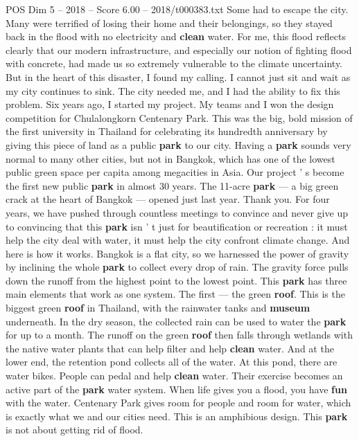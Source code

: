\begin{textsample}{POS Dim 5 – 2018 – Score 6.00 – 2018/t000383.txt}
Some had to escape the city.
Many were terrified of losing their home and their belongings, so they stayed back in the flood with no electricity and \textbf{clean} water.
For me, this flood reflects clearly that our modern infrastructure, and especially our notion of fighting flood with concrete, had made us so extremely vulnerable to the climate uncertainty.
But in the heart of this disaster, I found my calling.
I cannot just sit and wait as my city continues to sink.
The city needed me, and I had the ability to fix this problem.
Six years ago, I started my project.
My teams and I won the design competition for Chulalongkorn Centenary Park.
This was the big, bold mission of the first university in Thailand for celebrating its hundredth anniversary by giving this piece of land as a public \textbf{park} to our city.
Having a \textbf{park} sounds very normal to many other cities, but not in Bangkok, which has one of the lowest public green space per capita among megacities in Asia.
Our project ' s become the first new public \textbf{park} in almost 30 years.
The 11-acre \textbf{park} — a big green crack at the heart of Bangkok — opened just last year.
Thank you.
For four years, we have pushed through countless meetings to convince and never give up to convincing that this \textbf{park} isn ' t just for beautification or recreation : it must help the city deal with water, it must help the city confront climate change.
And here is how it works.
Bangkok is a flat city, so we harnessed the power of gravity by inclining the whole \textbf{park} to collect every drop of rain.
The gravity force pulls down the runoff from the highest point to the lowest point.
This \textbf{park} has three main elements that work as one system.
The first — the green \textbf{roof}.
This is the biggest green \textbf{roof} in Thailand, with the rainwater tanks and \textbf{museum} underneath.
In the dry season, the collected rain can be used to water the \textbf{park} for up to a month.
The runoff on the green \textbf{roof} then falls through wetlands with the native water plants that can help filter and help \textbf{clean} water.
And at the lower end, the retention pond collects all of the water.
At this pond, there are water bikes.
People can pedal and help \textbf{clean} water.
Their exercise becomes an active part of the \textbf{park} water system.
When life gives you a flood, you have \textbf{fun} with the water.
Centenary Park gives room for people and room for water, which is exactly what we and our cities need.
This is an amphibious design.
This \textbf{park} is not about getting rid of flood.

\end{textsample}
